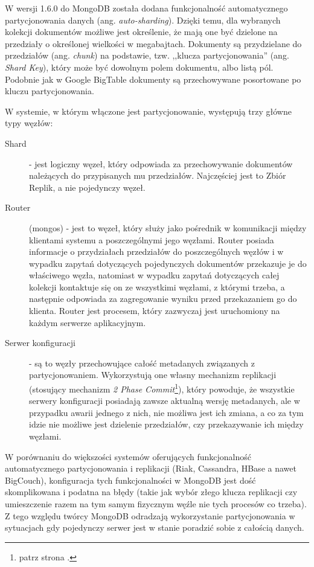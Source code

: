 
W wersji 1.6.0 do MongoDB została dodana funkcjonalność automatycznego partycjonowania danych (ang. \emph{auto-sharding}).
Dzięki temu, dla wybranych kolekcji dokumentów możliwe jest określenie, że mają one być dzielone na przedziały o określonej wielkości w megabajtach.
Dokumenty są przydzielane do przedziałów (ang. \emph{chunk}) na podstawie, tzw. ,,klucza partycjonowania'' (ang. \emph{Shard Key}), który może być dowolnym polem dokumentu, albo listą pól.
Podobnie jak w Google BigTable dokumenty są przechowywane posortowane po kluczu partycjonowania.

W systemie, w którym włączone jest partycjonowanie, występują trzy główne typy węzłów:

\begin{description}
 \item[Shard] - jest logiczny węzeł, który odpowiada za przechowywanie dokumentów należących do przypisanych mu przedziałów.
 Najczęściej jest to Zbiór Replik, a nie pojedynczy węzeł.
 \item[Router] (mongos) - jest to węzeł, który służy jako pośrednik w komunikacji między klientami systemu a poszczególnymi jego węzłami.
 Router posiada informacje o przydziałach przedziałów do poszczególnych węzłów i w wypadku zapytań dotyczących pojedynczych dokumentów przekazuje je do właściwego węzła, natomiast w wypadku zapytań dotyczących całej kolekcji kontaktuje się on ze wszystkimi węzłami, z którymi trzeba, a następnie odpowiada za zagregowanie wyniku przed przekazaniem go do klienta.
 Router jest procesem, który zazwyczaj jest uruchomiony na każdym serwerze aplikacyjnym.
 \item[Serwer konfiguracji] - są to węzły przechowujące całość metadanych związanych z partycjonowaniem.
 Wykorzystują one własny mechanizm replikacji (stosujący mechanizm \emph{2 Phase Commit}\footnote{patrz strona \pageref{sec:2-phase-commit}.}), który powoduje, że wszystkie serwery konfiguracji posiadają zawsze aktualną wersję metadanych, ale w przypadku awarii jednego z nich, nie możliwa jest ich zmiana, a co za tym idzie nie możliwe jest dzielenie przedziałów, czy przekazywanie ich między węzłami.
\end{description}

W porównaniu do większości systemów oferujących funkcjonalność automatycznego partycjonowania i replikacji (Riak, Cassandra, HBase a nawet BigCouch), konfiguracja tych funkcjonalności w MongoDB jest dość skomplikowana i podatna na błędy (takie jak wybór złego klucza replikacji czy umieszczenie razem na tym samym fizycznym węźle nie tych procesów co trzeba).
Z tego względu twórcy MongoDB odradzają wykorzystanie partycjonowania w sytuacjach gdy pojedynczy serwer jest w stanie poradzić sobie z całością danych.

